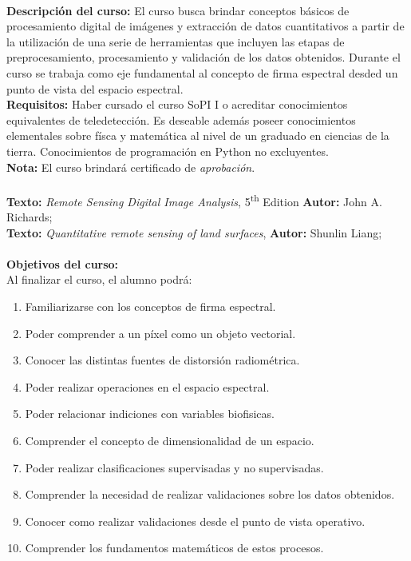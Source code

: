\documentclass[11pt]{article}
\begin{document}
\textbf {\large \\ Descripción del curso:} El curso busca brindar conceptos
básicos de procesamiento digital de imágenes y extracción de datos cuantitativos
a partir de la utilización de una serie de herramientas que incluyen las etapas
de preprocesamiento, procesamiento y validación de los datos obtenidos. Durante
el curso se trabaja como eje fundamental al concepto de firma espectral desded
un punto de vista del espacio espectral.\\
\textbf {Requisitos:} Haber cursado el curso SoPI I o acreditar conocimientos
equivalentes de teledetección. Es deseable además poseer conocimientos elementales 
sobre físca y matemática al nivel de un graduado en ciencias de la tierra. 
Conocimientos de programación en Python no excluyentes.
\\
\textbf {Nota:} El curso brindará certificado de {\it aprobación}.
\\
\\
\textbf {\large Texto:} \emph{Remote Sensing Digital Image Analysis},
5\textsuperscript{th} Edition
\textbf {Autor:} John A. Richards; \\
\textbf {\large Texto:} \emph{Quantitative remote sensing of land surfaces},
\textbf {Autor:} Shunlin Liang;\\
\\
\textbf {\large Objetivos del curso:} \\
Al finalizar el curso, el alumno podr\'a:
\begin{enumerate} \itemsep-0.4em
  \item Familiarizarse con los conceptos de firma espectral.
  \item Poder comprender a un píxel como un objeto vectorial.
  \item Conocer las distintas fuentes de distorsión radiométrica.
  \item Poder realizar operaciones en el espacio espectral.
  \item Poder relacionar indiciones con variables biofisicas.
  \item Comprender el concepto de dimensionalidad de un espacio.
  \item Poder realizar clasificaciones supervisadas y no supervisadas.
  \item Comprender la necesidad de realizar validaciones sobre los datos
      obtenidos.
  \item Conocer como realizar validaciones desde el punto de vista operativo.
  \item Comprender los fundamentos matemáticos de estos procesos.
\end{enumerate}
\end{document}
